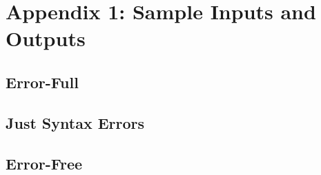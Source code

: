 \documentclass[titlepage]{article}
\newcommand{\ShowSampleFile}[2]
{
    
}
\newcommand{\ShowTokenFile}[2]
{
    
}
\begin{document}
    \clearpage{}
    \section*{Appendix 1: Sample Inputs and Outputs} %
    \subsection{Error-Full}
    \ShowSampleFile{appendix1/error_full/debug.pas}{Error-Full Source Code}
    \ShowSampleFile{appendix1/error_full/listing.txt}{Error-Full Listing File}
    \ShowTokenFile{appendix1/error_full/tokens.dat}{Error-Full Token File}

    \subsection{Just Syntax Errors}
    \ShowSampleFile{appendix1/just_syn/just_syn.pas}{Just Syntax Source Code}
    \ShowSampleFile{appendix1/just_syn/listing.txt}{Just Syntax Listing File}
    \ShowTokenFile{appendix1/just_syn/tokens.dat}{Just Syntax Token File}

    \subsection{Error-Free}
    \ShowSampleFile{appendix1/error_free/debug.pas}{Error-Free Source Code}
    \ShowSampleFile{appendix1/error_free/listing.txt}{Error-Free Listing File}
    \ShowTokenFile{appendix1/error_free/tokens.dat}{Error-Free Token File}

    \twocolumn{}
\end{document}
